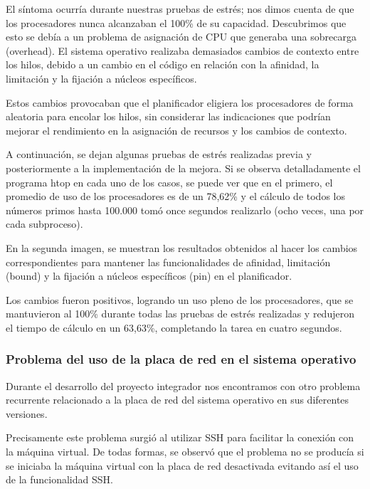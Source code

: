 El síntoma ocurría durante nuestras pruebas de estrés; nos dimos cuenta de que los procesadores nunca alcanzaban el 100\% de su capacidad. Descubrimos que esto se debía a un problema de asignación de CPU que generaba una sobrecarga (overhead). El sistema operativo realizaba demasiados cambios de contexto entre los hilos, debido a un cambio en el código en relación con la afinidad, la limitación y la fijación a núcleos específicos.

Estos cambios provocaban que el planificador eligiera los procesadores de forma aleatoria para encolar los hilos, sin considerar las indicaciones que podrían mejorar el rendimiento en la asignación de recursos y los cambios de contexto.


A continuación, se dejan algunas pruebas de estrés realizadas previa y posteriormente a la implementación de la mejora. Si se observa detalladamente el programa htop en cada uno de los casos, se puede ver que en el primero, el promedio de uso de los procesadores es de un 78,62\% y el cálculo de todos los números primos hasta 100.000 tomó once segundos realizarlo (ocho veces, una por cada subproceso).

En la segunda imagen, se muestran los resultados obtenidos al hacer los cambios correspondientes para mantener las funcionalidades de afinidad, limitación (bound) y la fijación a núcleos específicos (pin) en el planificador.

Los cambios fueron positivos, logrando un uso pleno de los procesadores, que se mantuvieron al 100\% durante todas las pruebas de estrés realizadas y redujeron el tiempo de cálculo en un 63,63\%, completando la tarea en cuatro segundos.



\subsubsection{Problema del uso de la placa de red en el sistema operativo}

Durante el desarrollo del proyecto integrador nos encontramos con otro problema recurrente relacionado a la placa de red del sistema operativo en sus diferentes versiones.

Precisamente este problema surgió al utilizar SSH para facilitar la conexión con la máquina virtual. De todas formas, se observó que el problema no se producía si se iniciaba la máquina virtual con la placa de red desactivada evitando así el uso de la funcionalidad SSH.

